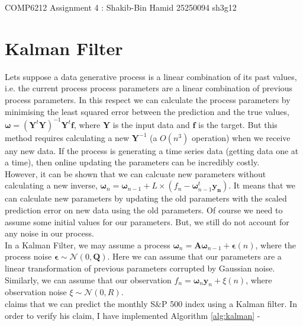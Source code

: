 \documentclass[11pt, fleqn]{article}
\begin{document}
\begin{center}

\Large{COMP6212 Assignment 4 : Shakib-Bin Hamid 25250094 sh3g12}

\end{center}

\section{Kalman Filter}

Lets suppose a data generative process is a linear combination of its past values, i.e. the current process process parameters are a linear combination of previous process parameters. In this respect we can calculate the process parameters by minimising the least squared error between the prediction and the true values, $\bm{\omega} = (\bm{Y}^t\bm{Y})^{-1}\bm{Y}^t\bm{f}$, where $\bm{Y}$ is the input data and $\bm{f}$ is the target. But this method requires calculating a new $\bm{Y}^{-1}$ (a $O(n^3)$ operation) when we receive any new data. If the process is generating a time series data (getting data one at a time), then online updating the parameters can be incredibly costly.\\

However, it can be shown that we can calcuate new parameters without calculating a new inverse, $\bm{\omega}_n = \bm{\omega}_{n-1} + L \times (f_n - \bm{\omega}_{n-1}^t\bm{y_n})$. It means that we can calculate new parameters by updating the old parameters with the scaled prediction error on new data using the old parameters. Of course we need to assume some initial values for our parameters. But, we still do not account for any noise in our process.\\

In a Kalman Filter, we may assume a process $\bm{\omega}_n = \bm{A}\bm{\omega}_{n-1} + \bm{\epsilon}(n)$, where the process noise $\bm{\epsilon} \sim \mathcal{N}(0, \bm{Q})$. Here we can assume that our parameters are a linear transformation of previous parameters corrupted by Gaussian noise. Similarly, we can assume that our observation $f_n = \bm{\omega}_n\bm{y}_n + \xi(n)$, where observation noise $\xi \sim \mathcal{N}(0, R)$.\\

\cite{mahler} claims that we can predict the monthly S\&P 500 index using a Kalman filter. In order to verify his claim, I have implemented Algorithm \ref{alg:kalman} -
\end{document}

